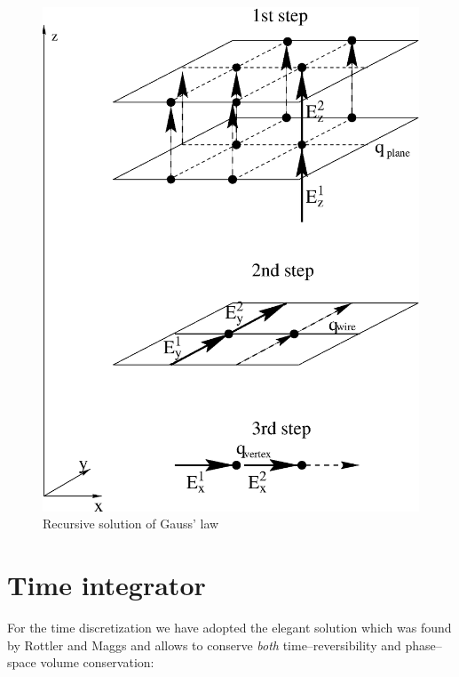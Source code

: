 \documentclass[a4paper, 12pt]{article}
\begin{document}
\begin{figure}
 \centering \includegraphics[scale=0.74]{figs/initializationE.eps}
 \caption{Recursive solution of Gauss' law} 
 \label{fig:initialization_E} 
\end{figure} 

%
\section{Time integrator}
%
For the time discretization we have adopted the elegant solution which was found by
Rottler and Maggs \cite{maggs_prl_1} and allows to conserve {\em both}
time--reversibility and phase--space volume conservation:
\end{document}

